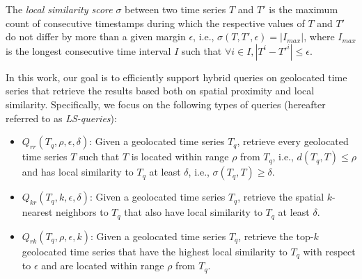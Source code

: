 \begin{mydefinition}
The {\em local similarity score} $\sigma$ between two time series $T$ and $T'$ is the maximum count of consecutive timestamps during which the respective values of $T$ and $T'$ do not differ by more than a given margin $\epsilon$, i.e., $\sigma(T, T', \epsilon) = |I_{max}|$, where $I_{max}$ is the longest consecutive time interval $I$ such that $\forall i \in I, |T^{i} - T'^{i}| \leq \epsilon$.
\end{mydefinition}




In this work, our goal is to efficiently support hybrid queries on geolocated time series that retrieve the results based both on spatial proximity and local similarity. Specifically, we focus on the following types of queries (hereafter referred to as \textit{LS-queries}):

\begin{itemize}
    \item $Q_{rr}(T_q, \rho, \epsilon, \delta)$: Given a geolocated time series $T_q$, retrieve every geolocated time series $T$ such that $T$ is located within range $\rho$ from $T_q$, i.e., $d(T_q, T) \leq \rho$ and has local similarity to $T_q$ at least $\delta$, i.e., $\sigma(T_q, T) \geq \delta$.
    \item $Q_{kr}(T_q, k, \epsilon, \delta)$: Given a geolocated time series $T_q$, retrieve the spatial $k$-nearest neighbors to $T_q$ that also have local similarity to $T_q$ at least $\delta$.
    \item $Q_{rk}(T_q, \rho, \epsilon, k)$: Given a geolocated time series $T_q$, retrieve the top-$k$ geolocated time series that have the highest local similarity to $T_q$ with respect to $\epsilon$ and are located within range $\rho$ from $T_q$.
\end{itemize}

